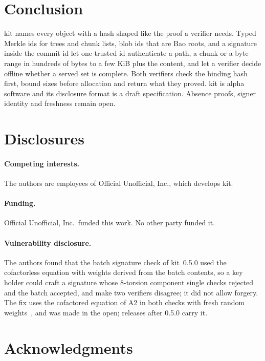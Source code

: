 \documentclass[10pt,letterpaper]{article}
\theoremstyle{remark}
\newcommand{\kit}{\textsf{kit}}
\begin{document}
\section{Conclusion}\label{sec:conclusion}

\kit{} names every object with a hash shaped like the proof a verifier needs.
Typed Merkle ids for trees and chunk lists, blob ids that are Bao roots, and a
signature inside the commit id let one trusted id authenticate a path, a chunk
or a byte range in hundreds of bytes to a few KiB plus the content, and let a
verifier decide offline whether a served set is complete. Both verifiers check
the binding hash first, bound sizes before allocation and return what they
proved. \kit{} is alpha software and its disclosure format is a draft
specification. Absence proofs, signer identity and freshness remain open.

\section*{Disclosures}

\paragraph{Competing interests.} The authors are employees of Official
Unofficial, Inc., which develops \kit{}.

\paragraph{Funding.} Official Unofficial, Inc.\ funded this work. No other
party funded it.

\paragraph{Vulnerability disclosure.} The authors found that the batch
signature check of \kit{}~0.5.0 used the cofactorless equation with weights
derived from the batch contents, so a key holder could craft a signature whose
8-torsion component single checks rejected and the batch accepted, and make
two verifiers disagree; it did not allow forgery. The fix uses the cofactored
equation of A2 in both checks with fresh random weights~\cite{taming}, and was
made in the open; releases after 0.5.0 carry it.

\section*{Acknowledgments}
\end{document}
